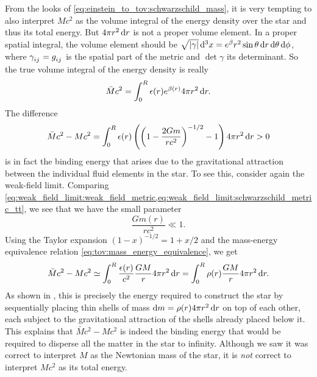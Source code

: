 From the looks of \cref{eq:einstein_to_tov:schwarzschild_mass}, it is very tempting to also interpret $M c^2$ as the volume integral of the energy density over the star and thus its total energy.
But $4 \pi r^2 \dif r$ is not a proper volume element.
In a proper spatial integral, the volume element should be $\sqrt{\det{\gamma}} \dif^3 x = e^\beta r^2 \sin \theta \dif r \dif \theta \dif \phi$, where $\gamma\indices{_i_j} = g\indices{_i_j}$ is the spatial part of the metric and $\det{\gamma}$ its determinant.
So the true volume integral of the energy density is really
\begin{equation*}
	\bar{M} c^2 = \integral{\epsilon(r) e^{\beta(r)} 4 \pi r^2}{r}{0}{R} .
\end{equation*}
The difference
\begin{equation*}
	\bar{M} c^2 - M c^2 = \integral{\epsilon(r) \left( \left( 1-\frac{2Gm}{rc^2} \right)^{-1/2} - 1 \right) 4 \pi r^2}{r}{0}{R} > 0
\end{equation*}
is in fact the binding energy that arises due to the gravitational attraction between the individual fluid elements in the star.
To see this, consider again the weak-field limit.
Comparing \cref{eq:weak_field_limit:weak_field_metric,eq:weak_field_limit:schwarzschild_metric_tt}, we see that we have the small parameter
\begin{equation}
	\frac{G m(r)}{rc^2} \ll 1 .
	\label{eq:weak_field_limit:small_gmr}
\end{equation}
Using the Taylor expansion $(1 - x)^{-1/2} = 1 + x/2$ and the mass-energy equivalence relation \eqref{eq:tov:mass_energy_equivalence}, we get
\begin{equation}
	\bar{M} c^2 - M c^2 \taylor \integral{\frac{\epsilon(r)}{c^2} \frac{GM}{r} 4 \pi r^2}{r}{0}{R}
	                    =       \integral{\rho(r) \frac{GM}{r} 4 \pi r^2}{r}{0}{R} .
\end{equation}
As shown in \cite[exercise 23.7]{ref:mtw}, this is precisely the energy required to construct the star by sequentially placing thin shells of mass $\dif m = \rho(r) 4 \pi r^2 \dif r$ on top of each other, each subject to the gravitational attraction of the shells already placed below it.
This explains that $\bar{M} c^2 - M c^2$ is indeed the binding energy that would be required to disperse all the matter in the star to infinity.
Although we saw it was correct to interpret $M$ as the Newtonian mass of the star, it is \emph{not} correct to interpret $Mc^2$ as its total energy.


